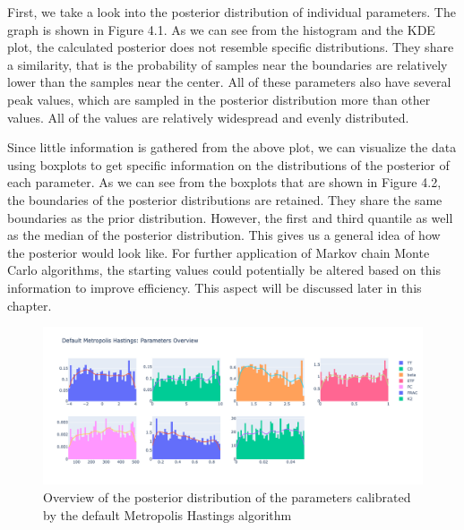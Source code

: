 First, we take a look into the posterior distribution of individual parameters. The graph is shown in Figure 4.1. As we can see from the histogram and the KDE plot, the calculated posterior does not resemble specific distributions. They share a similarity, that is the probability of samples near the boundaries are relatively lower than the samples near the center. All of these parameters also have several peak values, which are sampled in the posterior distribution more than other values. All of the values are relatively widespread and evenly distributed. 

Since little information is gathered from the above plot, we can visualize the data using boxplots to get specific information on the distributions of the posterior of each parameter. As we can see from the boxplots that are shown in Figure 4.2, the boundaries of the posterior distributions are retained. They share the same boundaries as the prior distribution. However, the first and third quantile as well as the median of the posterior distribution. This gives us a general idea of how the posterior would look like. For further application of Markov chain Monte Carlo algorithms, the starting values could potentially be altered based on this information to improve efficiency. This aspect will be discussed later in this chapter.


\begin{figure}[H]
    \centering
    \includegraphics[width=1\textwidth]{figures/basic_mh/default_mh/default_mh_parameters_overview.png}
    \captionsetup{width=.8\textwidth}
    \caption{Overview of the posterior distribution of the parameters calibrated by the default Metropolis Hastings algorithm}
    \label{fig:enter-label}
\end{figure}



